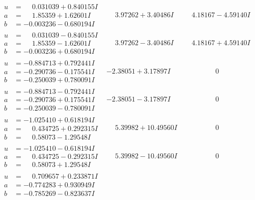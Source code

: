 \documentclass[1p]{elsarticle_modified}
\theoremstyle{definition}
\begin{document}
$$\begin{array}{c|c|c}
\begin{aligned}
u &= \phantom{-}0.031039 + 0.840155 I \\
a &= \phantom{-}1.85359 + 1.62601 I \\
b &= -0.003236 - 0.680194 I\end{aligned}
 & \phantom{-}3.97262 + 3.40486 I & \phantom{-}4.18167 - 4.59140 I \\ \hline\begin{aligned}
u &= \phantom{-}0.031039 - 0.840155 I \\
a &= \phantom{-}1.85359 - 1.62601 I \\
b &= -0.003236 + 0.680194 I\end{aligned}
 & \phantom{-}3.97262 - 3.40486 I & \phantom{-}4.18167 + 4.59140 I \\ \hline\begin{aligned}
u &= -0.884713 + 0.792441 I \\
a &= -0.290736 - 0.175541 I \\
b &= -0.250039 + 0.780091 I\end{aligned}
 & -2.38051 + 3.17897 I & \phantom{-0.000000 } 0 \\ \hline\begin{aligned}
u &= -0.884713 - 0.792441 I \\
a &= -0.290736 + 0.175541 I \\
b &= -0.250039 - 0.780091 I\end{aligned}
 & -2.38051 - 3.17897 I & \phantom{-0.000000 } 0 \\ \hline\begin{aligned}
u &= -1.025410 + 0.618194 I \\
a &= \phantom{-}0.434725 + 0.292315 I \\
b &= \phantom{-}0.58073 - 1.29548 I\end{aligned}
 & \phantom{-}5.39982 + 10.49560 I & \phantom{-0.000000 } 0 \\ \hline\begin{aligned}
u &= -1.025410 - 0.618194 I \\
a &= \phantom{-}0.434725 - 0.292315 I \\
b &= \phantom{-}0.58073 + 1.29548 I\end{aligned}
 & \phantom{-}5.39982 - 10.49560 I & \phantom{-0.000000 } 0 \\ \hline\begin{aligned}
u &= \phantom{-}0.709657 + 0.233871 I \\
a &= -0.774283 + 0.930949 I \\
b &= -0.785269 - 0.823637 I\end{aligned}

\end{array}$$
\end{document}

